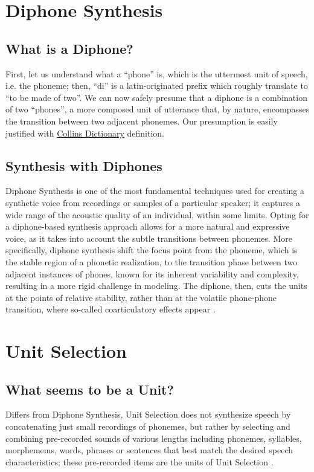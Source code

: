 \documentclass[10pt]{report}
\begin{document}
\section{Diphone Synthesis}
\subsection{What is a Diphone?}
First, let us understand what a ``phone'' is, which is the uttermost unit of speech, i.e. the phoneme; then, ``di'' is a latin-originated prefix which roughly translate to ``to be made of two''. We can now safely presume that a diphone is a combination of two ``phones'', a more composed unit of utterance that, by nature, encompasses the transition between two adjacent phonemes. Our presumption is easily justified with \href{https://www.collinsdictionary.com/dictionary/english/diphone}{Collins Dictionary} definition.

\subsection{Synthesis with Diphones}
Diphone Synthesis is one of the most fundamental techniques used for creating a synthetic voice from recordings or samples of a particular speaker; it captures a wide range of the acoustic quality of an individual, within some limits. Opting for a diphone-based synthesis approach allows for a more natural and expressive voice, as it takes into account the subtle transitions between phonemes. More specifically, diphone synthesis shift the focus point from the phoneme, which is the stable region of a phonetic realization, to the transition phase between two adjacent instances of phones, known for its inherent variability and complexity, resulting in a more rigid challenge in modeling. The diphone, then, cuts the units at the points of relative stability, rather than at the volatile phone-phone transition, where so-called coarticulatory effects appear \cite{lenzo03}.

\section{Unit Selection}
\subsection{What seems to be a Unit?}
Differs from Diphone Synthesis, Unit Selection does not synthesize speech by concatenating just small recordings of phonemes, but rather by selecting and combining pre-recorded sounds of various lengths including phonemes, syllables, morphemems, words, phrases or sentences that best match the desired speech characteristics; these pre-recorded items are the units of Unit Selection \cite{kayte15}.
\end{document}
